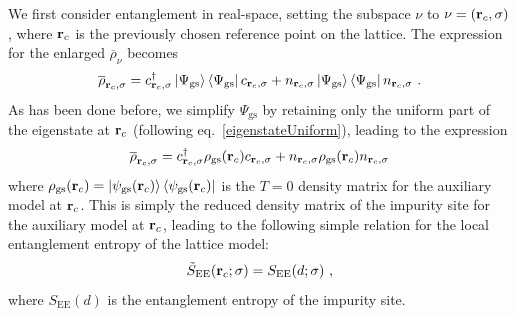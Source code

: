 \documentclass[reprint,hidelinks]{revtex4-2}
\begin{document}
We first consider entanglement in real-space, setting the subspace \(\nu\) to \(\nu=({\bf r}_c,\sigma)\), where \({\bf r}_c\) is the previously chosen reference point on the lattice. The expression for the enlarged \(\overline\rho_{\nu}\) becomes
\begin{equation}\begin{aligned}
	\overline\rho_{{\bf r}_c,\sigma} = c^\dagger_{{\bf r}_c,\sigma} \ket{\Psi_\text{gs}}\bra{\Psi_\text{gs}} c_{{\bf r}_c,\sigma} + n_{{\bf r}_c,\sigma} \ket{\Psi_\text{gs}}\bra{\Psi_\text{gs}} n_{{\bf r}_c,\sigma}~.
\end{aligned}\end{equation}
As has been done before, we simplify \(\Psi_\text{gs}\) by retaining only the uniform part of the eigenstate at \({\bf r}_c\) (following eq.~\ref{eigenstateUniform}), leading to the expression
\begin{equation}\begin{aligned}
	\overline\rho_{{\bf r}_c,\sigma} = c^\dagger_{{\bf r}_c,\sigma} \rho_\text{gs}({\bf r}_c) c_{{\bf r}_c,\sigma} + n_{{\bf r}_c,\sigma} \rho_\text{gs}({\bf r}_c) n_{{\bf r}_c,\sigma}
\end{aligned}\end{equation}
where \(\rho_\text{gs}({\bf r}_c) = \ket{\psi_\text{gs}({\bf r}_c)}\bra{\psi_\text{gs}({\bf r}_c)}\) is the \(T=0\) density matrix for the auxiliary model at \({\bf r}_c\). This is simply the reduced density matrix of the impurity site for the auxiliary model at \({\bf r}_c\), leading to the following simple relation for the local entanglement entropy of the lattice model:
\begin{equation}\begin{aligned}
	\tilde S_\text{EE}({\bf r}_c;\sigma) = S_\text{EE}(d;\sigma)~,
\end{aligned}\end{equation}
where \(S_\text{EE}(d)\) is the entanglement entropy of the impurity site.
\end{document}

